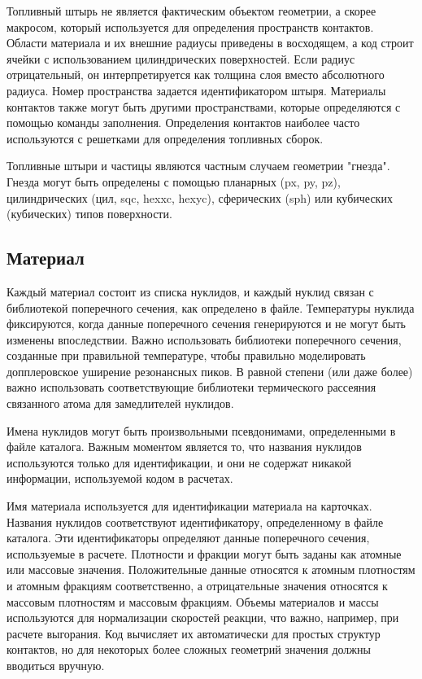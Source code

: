 Топливный штырь не является фактическим объектом геометрии, а скорее макросом, который используется для определения пространств контактов. Области материала и их внешние радиусы приведены в восходящем, а код строит ячейки с использованием цилиндрических поверхностей. Если радиус отрицательный, он интерпретируется как толщина слоя вместо абсолютного радиуса. Номер пространства задается идентификатором штыря. Материалы контактов также могут быть другими пространствами, которые определяются с помощью команды заполнения. 
Определения контактов наиболее часто используются с решетками для определения топливных сборок.

Топливные штыри и частицы являются частным случаем геометрии "гнезда". Гнезда могут
быть определены с помощью планарных (px, py, pz), цилиндрических (цил, sqc, hexxc, hexyc), сферических (sph) или кубических (кубических) типов поверхности. 

\subsection{Материал}

Каждый материал состоит из списка нуклидов, и каждый нуклид связан с библиотекой поперечного сечения, как определено в файле. Температуры нуклида фиксируются, когда данные поперечного сечения генерируются и не могут быть изменены впоследствии. Важно использовать библиотеки поперечного сечения, созданные при правильной температуре, чтобы правильно моделировать допплеровское уширение резонансных пиков. В равной степени (или даже более) важно использовать соответствующие библиотеки термического рассеяния связанного атома для замедлителей нуклидов.

Имена нуклидов могут быть произвольными псевдонимами, определенными в файле каталога. Важным моментом является то, что названия нуклидов используются только для идентификации, и они не содержат никакой информации, используемой кодом в расчетах.

Имя материала используется для идентификации материала на карточках. Названия нуклидов соответствуют идентификатору, определенному в файле каталога. Эти идентификаторы определяют данные поперечного сечения, используемые в расчете. Плотности и фракции могут быть заданы как атомные или массовые значения. Положительные данные относятся к атомным плотностям и атомным фракциям соответственно, а отрицательные значения относятся к массовым плотностям и массовым фракциям. Объемы материалов и массы используются для нормализации скоростей реакции, что важно, например, при расчете выгорания. Код вычисляет их автоматически для простых структур контактов, но для некоторых более сложных геометрий значения должны вводиться вручную. 

